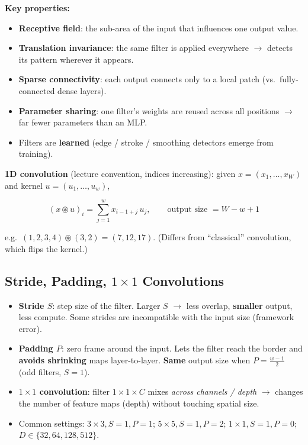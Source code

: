 \documentclass[10pt,a4paper]{article}
\begin{document}
	\textbf{Key properties:}
	\begin{itemize}[leftmargin=*]
		\item \textbf{Receptive field}: the sub-area of the input that influences one output value.
		\item \textbf{Translation invariance}: the same filter is applied everywhere $\rightarrow$ detects its pattern wherever it appears.
		\item \textbf{Sparse connectivity}: each output connects only to a local patch (vs.\ fully-connected dense layers).
		\item \textbf{Parameter sharing}: one filter's weights are reused across all positions $\rightarrow$ far fewer parameters than an MLP.
		\item Filters are \textbf{learned} (edge / stroke / smoothing detectors emerge from training).
	\end{itemize}

	\textbf{1D convolution} (lecture convention, indices increasing): given $x=(x_1,\dots,x_W)$ and kernel $u=(u_1,\dots,u_w)$,
	\begin{formulabox}
		\[
		(x\circledast u)_i = \sum_{j=1}^{w} x_{i-1+j}\,u_j, \qquad \text{output size } = W-w+1
		\]
	\end{formulabox}
	\noindent\footnotesize e.g.\ $(1,2,3,4)\circledast(3,2)=(7,12,17)$. (Differs from ``classical'' convolution, which flips the kernel.)\normalsize

	\subsection{Stride, Padding, $1{\times}1$ Convolutions}

	\begin{itemize}[leftmargin=*]
		\item \textbf{Stride $S$}: step size of the filter. Larger $S$ $\rightarrow$ less overlap, \textbf{smaller} output, less compute. Some strides are incompatible with the input size (framework error).
		\item \textbf{Padding $P$}: zero frame around the input. Lets the filter reach the border and \textbf{avoids shrinking} maps layer-to-layer. \textbf{Same} output size when $P=\frac{w-1}{2}$ (odd filters, $S{=}1$).
		\item \textbf{$1{\times}1$ convolution}: filter $1\times1\times C$ mixes \emph{across channels / depth} $\rightarrow$ changes the number of feature maps (depth) without touching spatial size.
		\item Common settings: $3{\times}3,S{=}1,P{=}1$; \; $5{\times}5,S{=}1,P{=}2$; \; $1{\times}1,S{=}1,P{=}0$; \; $D\in\{32,64,128,512\}$.
	\end{itemize}
\end{document}
